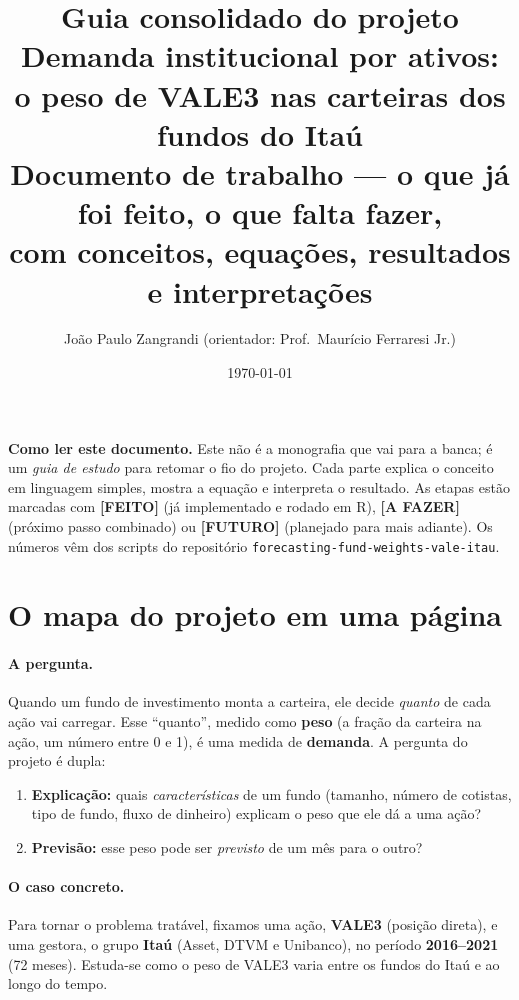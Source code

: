 \documentclass[11pt,a4paper]{article}
\title{\textbf{Guia consolidado do projeto}\\[4pt]
\large Demanda institucional por ativos: o peso de VALE3 nas carteiras dos fundos do Itaú\\[6pt]
\normalsize Documento de trabalho --- o que já foi feito, o que falta fazer,\\
com conceitos, equações, resultados e interpretações}
\author{João Paulo Zangrandi \quad (orientador: Prof.\ Maurício Ferraresi Jr.)}
\date{\today}
\newcommand{\feito}{\textcolor{feitog}{\textbf{[FEITO]}}}
\newcommand{\fazer}{\textcolor{fazerb}{\textbf{[A FAZER]}}}
\newcommand{\futuro}{\textcolor{fazerb}{\textbf{[FUTURO]}}}
\begin{document}
\maketitle

\begin{conceito}
\noindent\textbf{Como ler este documento.} Este não é a monografia que vai para a banca; é
um \emph{guia de estudo} para retomar o fio do projeto. Cada parte explica o conceito em
linguagem simples, mostra a equação e interpreta o resultado. As etapas estão marcadas com
\feito{} (já implementado e rodado em R), \fazer{} (próximo passo combinado) ou \futuro{}
(planejado para mais adiante). Os números vêm dos scripts do repositório
\texttt{forecasting-fund-weights-vale-itau}.
\end{conceito}

\tableofcontents
\bigskip

\section{O mapa do projeto em uma página}

\paragraph{A pergunta.} Quando um fundo de investimento monta a carteira, ele decide
\emph{quanto} de cada ação vai carregar. Esse ``quanto'', medido como \textbf{peso}
(a fração da carteira na ação, um número entre 0 e 1), é uma medida de \textbf{demanda}.
A pergunta do projeto é dupla:
\begin{enumerate}[topsep=2pt,itemsep=1pt]
\item \textbf{Explicação:} quais \emph{características} de um fundo (tamanho, número de
cotistas, tipo de fundo, fluxo de dinheiro) explicam o peso que ele dá a uma ação?
\item \textbf{Previsão:} esse peso pode ser \emph{previsto} de um mês para o outro?
\end{enumerate}

\paragraph{O caso concreto.} Para tornar o problema tratável, fixamos uma ação, \textbf{VALE3}
(posição direta), e uma gestora, o grupo \textbf{Itaú} (Asset, DTVM e Unibanco), no período
\textbf{2016--2021} (72 meses). Estuda-se como o peso de VALE3 varia entre os fundos do Itaú e
ao longo do tempo.
\end{document}
